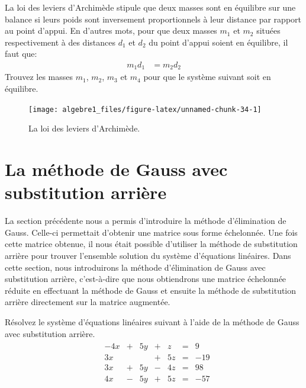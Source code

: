 \documentclass[]{book}
\theoremstyle{definition}
\theoremstyle{definition}
\theoremstyle{definition}
\theoremstyle{remark}
\let\BeginKnitrBlock\begin \let\EndKnitrBlock\end
\begin{document}
\BeginKnitrBlock{example}
\protect\hypertarget{exm:unnamed-chunk-33}{}{\label{exm:unnamed-chunk-33} }La loi des leviers d'Archimède stipule que deux masses sont en équilibre sur une balance si leurs poids sont inversement proportionnels à leur distance par rapport au point d'appui. En d'autres mots, pour que deux masses \(m_1\) et \(m_2\) situées respectivement à des distances \(d_1\) et \(d_2\) du point d'appui soient en équilibre, il faut que:
\begin{align*}
    m_1d_1 &= m_2d_2
\end{align*}
Trouvez les masses \(m_1\), \(m_2\), \(m_3\) et \(m_4\) pour que le système suivant soit en équilibre.
\EndKnitrBlock{example}

\begin{figure}

{\centering \texttt{[image: algebre1\_files/figure-latex/unnamed-chunk-34-1]} 

}

\caption{La loi des leviers d'Archimède.}\label{fig:unnamed-chunk-34}
\end{figure}

\hypertarget{la-methode-de-gauss-avec-substitution-arriere}{%
\section{La méthode de Gauss avec substitution arrière}\label{la-methode-de-gauss-avec-substitution-arriere}}

La section précédente nous a permis d'introduire la méthode d'élimination de Gauss. Celle-ci permettait d'obtenir une matrice sous forme échelonnée. Une fois cette matrice obtenue, il nous était possible d'utiliser la méthode de substitution arrière pour trouver l'ensemble solution du système d'équations linéaires. Dans cette section, nous introduirons la méthode d'élimination de Gauss avec substitution arrière, c'est-à-dire que nous obtiendrons une matrice échelonnée réduite en effectuant la méthode de Gauss et ensuite la méthode de substitution arrière directement sur la matrice augmentée.

\BeginKnitrBlock{example}
\protect\hypertarget{exm:unnamed-chunk-35}{}{\label{exm:unnamed-chunk-35} }Résolvez le système d'équations linéaires suivant à l'aide de la méthode de Gauss avec substitution arrière.
\begin{align*}
\begin{array}{cccccccc}
&-4x&+&5y&+&z&=&9\\
&3x&&&+&5z&=&-19\\
&3x&+&5y&-&4z&=&98\\
&4x&-&5y&+&5z&=&-57\\
\end{array}
\end{align*}
\EndKnitrBlock{example}
\end{document}

